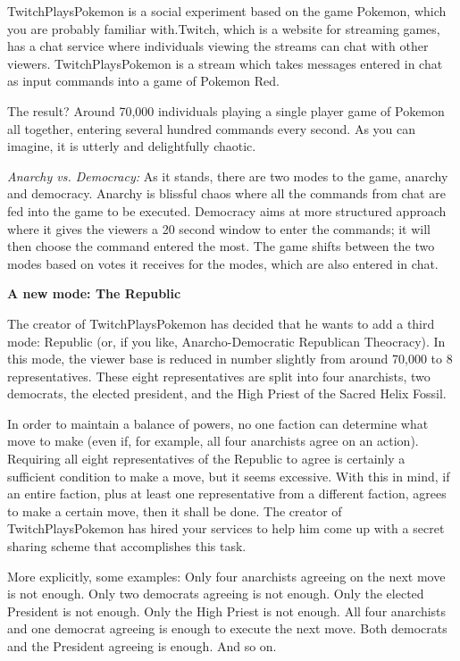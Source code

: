 \documentclass[]{article}
\begin{document}
\begin{qunlist}
TwitchPlaysPokemon is a social experiment based on the game Pokemon, which you are probably familiar with.Twitch, which is a website for streaming games, has a chat service where individuals viewing the streams can chat with other viewers. TwitchPlaysPokemon is a stream which takes messages entered in chat as input commands into a game of Pokemon Red.

The result? Around 70,000 individuals playing a single player game of Pokemon all together, entering several hundred commands every second. As you can imagine, it is utterly and delightfully chaotic. 

\textit{Anarchy vs. Democracy:}
As it stands, there are two modes to the game, anarchy and democracy. Anarchy is blissful chaos where all the commands from chat are fed into the game to be executed. Democracy aims at more structured approach where it gives the viewers a 20 second window to enter the commands; it will then choose the command entered the most. The game shifts between the two modes based on votes it receives for the modes, which are also entered in chat.

\newpage
\textbf{A new mode: The Republic}

The creator of TwitchPlaysPokemon has decided that he wants to add a third mode: Republic (or, if you like, Anarcho-Democratic Republican Theocracy). 
In this mode, the viewer base is reduced in number slightly from around 70,000 to $8$ representatives. 
These eight representatives are split into four anarchists, two democrats, the elected president, and the High Priest of the Sacred Helix Fossil. 

In order to maintain a balance of powers, no one faction can determine what move to make (even if, for example, all four anarchists agree on an action). Requiring all eight representatives of the Republic to agree is certainly a sufficient condition to make a move, but it seems excessive. With this in mind, if an entire faction, plus at least one representative from a different faction, agrees to make a certain move, then it shall be done.
The creator of TwitchPlaysPokemon has hired your services to help him come up with a secret sharing scheme that accomplishes this task.

More explicitly, some examples: 
Only four anarchists agreeing on the next move is not enough. 
Only two democrats agreeing is not enough. 
Only the elected President is not enough. 
Only the High Priest is not enough. 
All four anarchists and one democrat agreeing is enough to execute the next move.
Both democrats and the President agreeing is enough.
And so on.


\end{qunlist}
\end{document}
